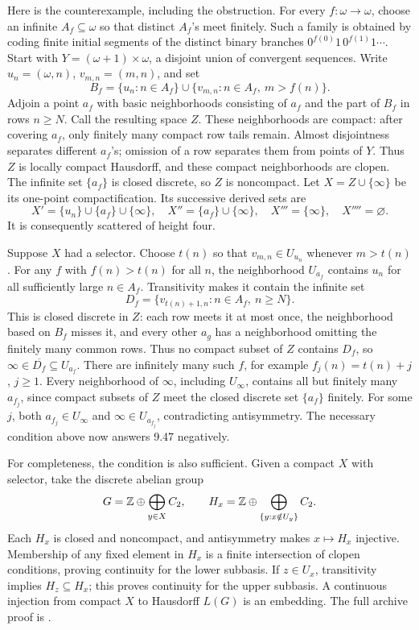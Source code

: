 Here is the counterexample, including the obstruction.
For every \(f:\omega\to\omega\), choose an infinite \(A_f\subseteq\omega\)
so that distinct \(A_f\)'s meet finitely. Such a family is obtained by
coding finite initial segments of the distinct binary branches
\(0^{f(0)}1\,0^{f(1)}1\cdots\).
Start with \(Y=(\omega+1)\times\omega\), a disjoint union of convergent
sequences. Write \(u_n=(\omega,n)\), \(v_{m,n}=(m,n)\), and set
\[
 B_f=\{u_n:n\in A_f\}\cup
       \{v_{m,n}:n\in A_f,\ m>f(n)\}.
\]
Adjoin a point \(a_f\) with basic neighborhoods consisting of \(a_f\)
and the part of \(B_f\) in rows \(n\ge N\).
Call the resulting space \(Z\). These neighborhoods are compact:
after covering \(a_f\), only finitely many compact row tails remain.
Almost disjointness separates different \(a_f\)'s; omission of a row
separates them from points of \(Y\). Thus \(Z\) is locally compact
Hausdorff, and these compact neighborhoods are clopen.
The infinite set \(\{a_f\}\) is closed discrete, so \(Z\) is noncompact.
Let \(X=Z\cup\{\infty\}\) be its one-point compactification.
Its successive derived sets are
\[
 X'=\{u_n\}\cup\{a_f\}\cup\{\infty\},\quad
 X''=\{a_f\}\cup\{\infty\},\quad
 X'''=\{\infty\},\quad X''''=\varnothing.
\]
It is consequently scattered of height four.

Suppose \(X\) had a selector. Choose \(t(n)\) so that
\(v_{m,n}\in U_{u_n}\) whenever \(m>t(n)\).
For any \(f\) with \(f(n)>t(n)\) for all \(n\), the neighborhood
\(U_{a_f}\) contains \(u_n\) for all sufficiently large \(n\in A_f\).
Transitivity makes it contain the infinite set
\[
 D_f=\{v_{t(n)+1,n}:n\in A_f,\ n\ge N\}.
\]
This is closed discrete in \(Z\): each row meets it at most once,
the neighborhood based on \(B_f\) misses it, and every other \(a_g\)
has a neighborhood omitting the finitely many common rows.
Thus no compact subset of \(Z\) contains \(D_f\), so
\(\infty\in\overline{D_f}\subseteq U_{a_f}\).
There are infinitely many such \(f\), for example \(f_j(n)=t(n)+j\),
\(j\ge1\). Every neighborhood of \(\infty\), including \(U_\infty\),
contains all but finitely many \(a_{f_j}\), since compact subsets of
\(Z\) meet the closed discrete set \(\{a_f\}\) finitely.
For some \(j\), both \(a_{f_j}\in U_\infty\) and
\(\infty\in U_{a_{f_j}}\), contradicting antisymmetry.
The necessary condition above now answers 9.47 negatively.

For completeness, the condition is also sufficient.
Given a compact \(X\) with selector, take the discrete abelian group
\[
 G=\mathbb Z\oplus\bigoplus_{y\in X}C_2,\qquad
 H_x=\mathbb Z\oplus\bigoplus_{\{y:x\notin U_y\}}C_2.
\]
Each \(H_x\) is closed and noncompact, and antisymmetry makes
\(x\mapsto H_x\) injective.
Membership of any fixed element in \(H_x\) is a finite intersection
of clopen conditions, proving continuity for the lower subbasis.
If \(z\in U_x\), transitivity implies \(H_z\subseteq H_x\);
this proves continuity for the upper subbasis.
A continuous injection from compact \(X\) to Hausdorff \(L(G)\)
is an embedding. The full archive proof is
.
